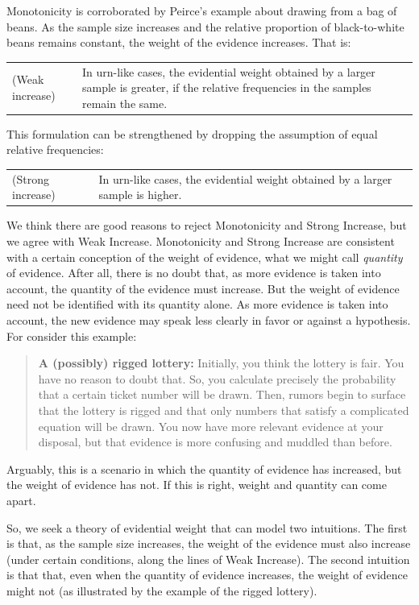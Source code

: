 \documentclass[
  10pt,
  dvipsnames,enabledeprecatedfontcommands]{scrartcl}
\begin{document}
\noindent Monotonicity is corroborated by Peirce's example about drawing
from a bag of beans. As the sample size increases and the relative
proportion of black-to-white beans remains constant, the weight of the
evidence increases. That is:

\begin{tabular}{lp{11cm}}
(Weak increase) & In urn-like cases, the evidential weight obtained by a larger sample is greater, if the relative frequencies in the samples remain the same.
\end{tabular}

\noindent This formulation can be strengthened by dropping the
assumption of equal relative frequencies:

\begin{tabular}{lp{11cm}}
(Strong increase) & In urn-like cases, the evidential weight obtained by a larger sample is higher.
\end{tabular}

\noindent We think there are good reasons to reject Monotonicity and
Strong Increase, but we agree with Weak Increase. Monotonicity and
Strong Increase are consistent with a certain conception of the weight
of evidence, what we might call \emph{quantity} of evidence. After all,
there is no doubt that, as more evidence is taken into account, the
quantity of the evidence must increase. But the weight of evidence need
not be identified with its quantity alone. As more evidence is taken
into account, the new evidence may speak less clearly in favor or
against a hypothesis. For consider this example:

\begin{quote}
\textbf{A (possibly) rigged lottery:} Initially, you think the lottery  is  fair. You have no reason to doubt that. So, you calculate precisely the probability that a certain ticket number will be drawn. Then, rumors begin to surface that the lottery is rigged and that only numbers that satisfy a complicated equation will be drawn. You now have more relevant evidence at your disposal, but that evidence is more confusing and muddled than before. 
\end{quote}

\noindent Arguably, this is a scenario in which the quantity of evidence
has increased, but the weight of evidence has not. If this is right,
weight and quantity can come apart.

So, we seek a theory of evidential weight that can model two intuitions.
The first is that, as the sample size increases, the weight of the
evidence must also increase (under certain conditions, along the lines
of Weak Increase). The second intuition is that that, even when the
quantity of evidence increases, the weight of evidence might not (as
illustrated by the example of the rigged lottery).
\end{document}
